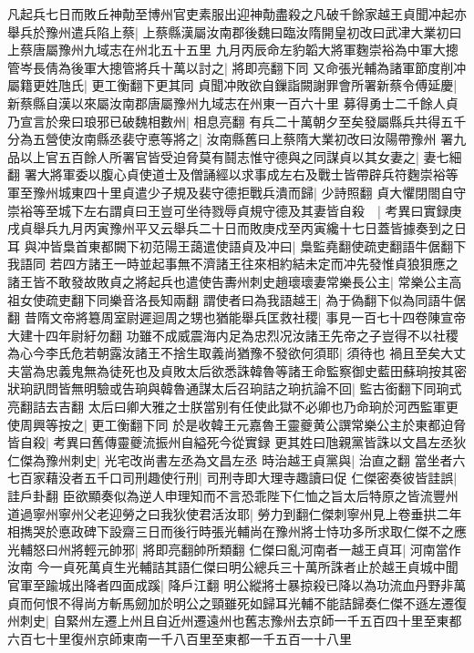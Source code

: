 凡起兵七日而敗丘神勣至博州官吏素服出迎神勣盡殺之凡破千餘家越王貞聞冲起亦舉兵於豫州遣兵陷上蔡|{
	上蔡縣漢屬汝南郡後魏曰臨汝隋開皇初改曰武冿大業初曰上蔡唐屬豫州九域志在州北五十五里}
九月丙辰命左豹韜大將軍麴崇裕為中軍大摠管岑長倩為後軍大摠管將兵十萬以討之|{
	將即亮翻下同}
又命張光輔為諸軍節度削冲屬籍更姓虺氏|{
	更工衡翻下更其同}
貞聞冲敗欲自鏁詣闕謝罪會所署新蔡令傅延慶|{
	新蔡縣自漢以來屬汝南郡唐屬豫州九域志在州東一百六十里}
募得勇士二千餘人貞乃宣言於衆曰琅邪已破魏相數州|{
	相息亮翻}
有兵二十萬朝夕至矣發屬縣兵共得五千分為五營使汝南縣丞裴守悳等將之|{
	汝南縣舊曰上蔡隋大業初改曰汝陽帶豫州}
署九品以上官五百餘人所署官皆受迫脅莫有鬪志惟守德與之同謀貞以其女妻之|{
	妻七細翻}
署大將軍委以腹心貞使道士及僧誦經以求事成左右及戰士皆帶辟兵符麴崇裕等軍至豫州城東四十里貞遣少子規及裴守德拒戰兵潰而歸|{
	少詩照翻}
貞大懼閉閤自守崇裕等至城下左右謂貞曰王豈可坐待戮辱貞規守德及其妻皆自殺　|{
	考異曰實録庚戌貞舉兵九月丙寅豫州平又云舉兵二十日而敗庚戍至丙寅纔十七日蓋皆據奏到之日耳}
與冲皆梟首東都闕下初范陽王藹遣使語貞及冲曰|{
	梟監堯翻使疏吏翻語牛倨翻下我語同}
若四方諸王一時並起事無不濟諸王往來相約結未定而冲先發惟貞狼狽應之諸王皆不敢發故敗貞之將起兵也遣使告夀州刺史趙瓌瓌妻常樂長公主|{
	常樂公主高祖女使疏吏翻下同樂音洛長知兩翻}
謂使者曰為我語越王|{
	為于偽翻下似為同語牛倨翻}
昔隋文帝將簒周室尉遲迴周之甥也猶能舉兵匡救社稷|{
	事見一百七十四卷陳宣帝大建十四年尉紆勿翻}
功雖不成威震海内足為忠烈况汝諸王先帝之子豈得不以社稷為心今李氏危若朝露汝諸王不捨生取義尚猶豫不發欲何須耶|{
	須待也}
禍且至矣大丈夫當為忠義鬼無為徒死也及貞敗太后欲悉誅韓魯等諸王命監察御史藍田蘇珦按其密狀珦訊問皆無明驗或告珦與韓魯通謀太后召珦詰之珦抗論不回|{
	監古銜翻下同珦式亮翻詰去吉翻}
太后曰卿大雅之士朕當别有任使此獄不必卿也乃命珦於河西監軍更使周興等按之|{
	更工衡翻下同}
於是收韓王元嘉魯王靈夔黄公譔常樂公主於東都迫脅皆自殺|{
	考異曰舊傳靈夔流振州自縊死今從實録}
更其姓曰虺親黨皆誅以文昌左丞狄仁傑為豫州刺史|{
	光宅改尚書左丞為文昌左丞}
時治越王貞黨與|{
	治直之翻}
當坐者六七百家藉没者五千口司刑趣使行刑|{
	司刑寺即大理寺趣讀曰促}
仁傑密奏彼皆詿誤|{
	詿戶卦翻}
臣欲顯奏似為逆人申理知而不言恐乖陛下仁恤之旨太后特原之皆流豐州道過寧州寧州父老迎勞之曰我狄使君活汝耶|{
	勞力到翻仁傑刺寧州見上卷垂拱二年}
相擕哭於悳政碑下設齋三日而後行時張光輔尚在豫州將士恃功多所求取仁傑不之應光輔怒曰州將輕元帥邪|{
	將即亮翻帥所類翻}
仁傑曰亂河南者一越王貞耳|{
	河南當作汝南}
今一貞死萬貞生光輔詰其語仁傑曰明公總兵三十萬所誅者止於越王貞城中聞官軍至踰城出降者四面成蹊|{
	降戶江翻}
明公縱將士暴掠殺已降以為功流血丹野非萬貞而何恨不得尚方斬馬劒加於明公之頸雖死如歸耳光輔不能詰歸奏仁傑不遜左遷復州刺史|{
	自緊州左遷上州且自近州遷遠州也舊志豫州去京師一千五百四十里至東都六百七十里復州京師東南一千八百里至東都一千五百一十八里}
